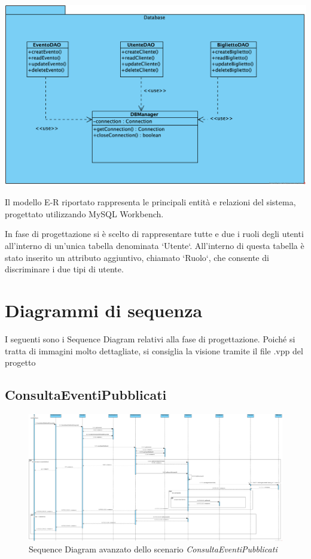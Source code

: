 \begin{center}	
	\vspace{1ex}
	\includegraphics[height=0.38\linewidth]{assets/package/PackageDatabase.png}
	\vspace{1ex}
\end{center}

Il modello E-R riportato rappresenta le principali entità e relazioni del sistema, progettato utilizzando MySQL Workbench.

In fase di progettazione si è scelto di rappresentare tutte e due i ruoli degli utenti all'interno di un'unica tabella denominata `Utente`. All'interno di questa tabella è stato inserito un attributo aggiuntivo, chiamato `Ruolo`, che consente di discriminare i due tipi di utente.

\section{Diagrammi di sequenza}
I seguenti sono i Sequence Diagram relativi alla fase di progettazione. Poiché si tratta di immagini molto dettagliate, si consiglia la visione tramite il file .vpp del progetto

\subsection*{ConsultaEventiPubblicati}
\begin{figure}[H]
\centering
\includegraphics[width=\linewidth]{assets/SDProgettazione/ConsultaEventiPubblicatiProgettazione.png}
\caption{Sequence Diagram avanzato dello scenario \textit{ConsultaEventiPubblicati}}
\end{figure}

